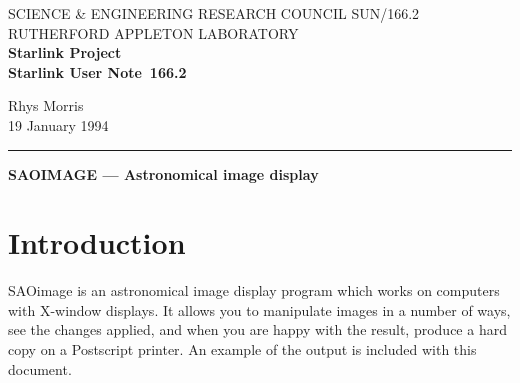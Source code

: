 \pagestyle{myheadings}

\newcommand{\stardoccategory}  {Starlink User Note}
\newcommand{\stardocinitials}  {SUN}
\newcommand{\stardocnumber}    {166.2}
\newcommand{\stardocauthors}   {Rhys Morris}
\newcommand{\stardocdate}      {19 January 1994}
\newcommand{\stardoctitle}     {SAOIMAGE --- Astronomical image display}

\newcommand{\stardocname}{\stardocinitials /\stardocnumber}
\renewcommand{\_}{{\tt\char'137}}     %
\markright{\stardocname}
\setlength{\textwidth}{160mm}
\setlength{\textheight}{230mm}
\setlength{\topmargin}{-2mm}
\setlength{\oddsidemargin}{0mm}
\setlength{\evensidemargin}{0mm}
\setlength{\parindent}{0mm}
\setlength{\parskip}{\medskipamount}
\setlength{\unitlength}{1mm}



\thispagestyle{empty}
SCIENCE \& ENGINEERING RESEARCH COUNCIL \hfill \stardocname\\
RUTHERFORD APPLETON LABORATORY\\
{\large\bf Starlink Project\\}
{\large\bf \stardoccategory\ \stardocnumber}
\begin{flushright}
\stardocauthors\\
\stardocdate
\end{flushright}
\vspace{-4mm}
\rule{\textwidth}{0.5mm}
\vspace{5mm}
\begin{center}
{\Large\bf \stardoctitle}
\end{center}
\vspace{5mm}

\section{Introduction} 

SAOimage is an astronomical image display program which works on
computers with X-window displays. It allows you to manipulate images
in a number of ways, see the changes applied, and when you are  happy
with the result, produce a hard copy on a Postscript
printer. An example of the output is included with this document.


